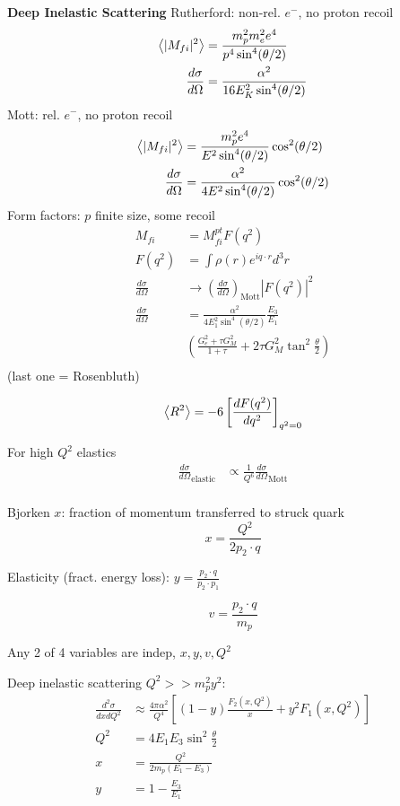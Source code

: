 \documentclass[10pt,letterpaper]{article}
\newcommand{\0}{\mathcal{O}}
\begin{document}
\begin{multicols}{3}
\textbf{Deep Inelastic Scattering}
Rutherford: non-rel. $e^-$, no proton recoil
\begin{align*}
    \expval{|M_{fi}|^2} &= \frac{m_p^2 m_e^2 e^4}{p^4 \sin^4(\theta/2)} \\
    \frac{d\sigma}{d\Omega} &= \frac{\alpha^2}{16 E_K^2 \sin^4(\theta/2)} \\
\end{align*}
Mott: rel. $e^-$, no proton recoil
\begin{align*}
    \expval{|M_{fi}|^2} &= \frac{m_p^2 e^4}{E^2 \sin^4(\theta/2)}\cos^2(\theta/2) \\
    \frac{d\sigma}{d\Omega} &= \frac{\alpha^2}{4 E^2 \sin^4(\theta/2)}\cos^2(\theta/2) \\
\end{align*}
Form factors: $p$ finite size, some recoil
\begin{align*}
    M_{fi} &= M_{fi}^{pt}F(q^2) \\
    F(q^2) &= \int \rho(r)e^{iq\cdot r} d^3r \\
    \frac{d\sigma}{d\Omega} &\to \left(\frac{d\sigma}{d\Omega}\right)_{\text{Mott}}|F(q^2)|^2 \\
    \frac{d\sigma}{d\Omega} &= \frac{\alpha^2}{4E_1^2\sin^4(\theta/2)}\frac{E_3}{E_1}\\
    &\left(\frac{G_e^2 + \tau G_M^2}{1+\tau} + 2\tau G_M^2 \tan^2 \frac{\theta}{2}\right) \\
\end{align*}
(last one = Rosenbluth)

\begin{align*}
    \expval{R^2} &= -6 \left[\frac{dF(q^2)}{dq^2}\right]_{q^2=0} \\
\end{align*}

For high $Q^2$ elastics
\begin{align*}
    \frac{d\sigma}{d\Omega}_\text{elastic} &\propto \frac{1}{Q^6}\frac{d\sigma}{d\Omega}_{\text{Mott}} \\
\end{align*}

Bjorken $x$: fraction of momentum transferred to struck quark
$$x = \frac{Q^2}{2p_2 \cdot q}$$

Elasticity (fract. energy loss): $y = \frac{p_2 \cdot q}{p_2 \cdot p_1}$

$$v = \frac{p_2 \cdot q}{m_p}$$

Any 2 of 4 variables are indep, $x, y, v, Q^2$

Deep inelastic scattering $Q^2 >> m_p^2 y^2$:
\begin{align*}
    \frac{d^2\sigma}{dx dQ^2} &\approx \frac{4\pi \alpha^2}{Q^4}\left[(1-y)\frac{F_2(x,Q^2)}{x} + y^2 F_1(x,Q^2)\right] \\
    Q^2 &= 4E_1E_3\sin^2\frac{\theta}{2}\\
    x &= \frac{Q^2}{2m_p(E_1-E_3)}\\
    y &= 1 - \frac{E_3}{E_1}\\
\end{align*}


\end{multicols}
\end{document}
